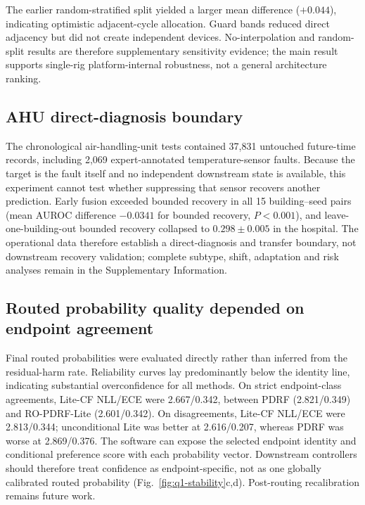\documentclass[11pt]{article}
\begin{document}
The earlier random-stratified split yielded a larger mean difference ($+0.044$), indicating optimistic adjacent-cycle allocation. Guard bands reduced direct adjacency but did not create independent devices. No-interpolation and random-split results are therefore supplementary sensitivity evidence; the main result supports single-rig platform-internal robustness, not a general architecture ranking.

\begin{table}[ht]
\centering
\caption{\textbf{Hydraulic single-rig sensitivity analysis.} Guarded-block affected-subset macro-AUROC values are means $\pm$ standard deviations across five matched seeds. The eight task--fault rows are conditions from one rig, not independent devices; the earlier random-stratified results are supplementary sensitivity evidence.}
\label{tab:major3-hydraulic}
\resizebox{0.92\textwidth}{!}{}
\end{table}

\subsection{AHU direct-diagnosis boundary}

The chronological air-handling-unit tests contained 37,831 untouched future-time records, including 2,069 expert-annotated temperature-sensor faults. Because the target is the fault itself and no independent downstream state is available, this experiment cannot test whether suppressing that sensor recovers another prediction. Early fusion exceeded bounded recovery in all 15 building--seed pairs (mean AUROC difference $-0.0341$ for bounded recovery, $P<0.001$), and leave-one-building-out bounded recovery collapsed to $0.298\pm0.005$ in the hospital. The operational data therefore establish a direct-diagnosis and transfer boundary, not downstream recovery validation; complete subtype, shift, adaptation and risk analyses remain in the Supplementary Information.

\subsection{Routed probability quality depended on endpoint agreement}

Final routed probabilities were evaluated directly rather than inferred from the residual-harm rate. Reliability curves lay predominantly below the identity line, indicating substantial overconfidence for all methods. On strict endpoint-class agreements, Lite-CF NLL/ECE were 2.667/0.342, between PDRF (2.821/0.349) and RO-PDRF-Lite (2.601/0.342). On disagreements, Lite-CF NLL/ECE were 2.813/0.344; unconditional Lite was better at 2.616/0.207, whereas PDRF was worse at 2.869/0.376. The software can expose the selected endpoint identity and conditional preference score with each probability vector. Downstream controllers should therefore treat confidence as endpoint-specific, not as one globally calibrated routed probability (Fig.~\ref{fig:q1-stability}c,d). Post-routing recalibration remains future work.
\FloatBarrier
\end{document}
